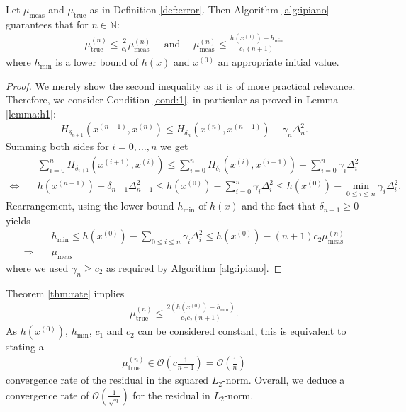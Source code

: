 \documentclass[onecolumn,final,a4paper,13pt,reqno]{siamart}
\begin{document}
\begin{theoremmd}
	Let $\mu_\text{meas}$ and $\mu_\text{true}$ as in Definition \ref{def:error}. Then Algorithm \ref{alg:ipiano} guarantees that for $n \in \mathbb{N}$:
	\begin{align}
		\mu_\text{true}^{(n)} \leq \frac{2}{c_1} \mu_\text{meas}^{(n)}\quad\text{ and }\quad \mu_\text{meas}^{(n)} \leq \frac{h(x^{(0)}) - h_{\min}}{c_1(n + 1)}
	\end{align}
	where $h_{\min}$ is a lower bound of $h(x)$ and $x^{(0)}$ an appropriate initial value.\label{thm:rate}
\end{theoremmd}

\begin{proof}
	We merely show the second inequality as it is of more practical relevance. Therefore, we consider Condition \ref{cond:1}, in particular as proved in Lemma \ref{lemma:h1}:
	\begin{align}
		H_{\delta_{n + 1}}(x^{(n + 1)}, x^{(n)}) \leq H_{\delta_n}(x^{(n)}, x^{(n -1)}) - \gamma_n \Delta_n^2.
	\end{align}
	Summing both sides for $i = 0, \ldots, n$ we get
	\begin{align}
		&\sum_{i = 0}^n H_{\delta_{i + 1}}(x^{(i + 1)}, x^{(i)}) \leq \sum_{i = 0}^n H_{\delta_i}(x^{(i)}, x^{(i - 1)}) - \sum_{i = 0}^n \gamma_i \Delta_i^2\\
		\Leftrightarrow\quad& h(x^{(n + 1)}) + \delta_{n + 1} \Delta_{n + 1}^2 \leq h(x^{(0)}) - \sum_{i = 0}^n \gamma_i \Delta_i^2 \leq h(x^{(0)}) - \min_{0 \leq i \leq n} \gamma_i \Delta_i^2.
	\end{align}
	Rearrangement, using the lower bound $h_{\min}$ of $h(x)$ and the fact that $\delta_{n + 1} \geq 0$ yields
	\begin{align}
		&h_{\min} \leq h(x^{(0)}) - \sum_{0 \leq i \leq n} \gamma_i \Delta_i^2 \leq h(x^{(0)}) - (n + 1) c_2 \mu_\text{meas}^{(n)}\\
		\Rightarrow\quad& \mu_\text{meas}
	\end{align}
	where we used $\gamma_n \geq c_2$ as required by Algorithm \ref{alg:ipiano}.
\end{proof}

Theorem \ref{thm:rate} implies
\begin{align}
	\mu_\text{true}^{(n)} \leq \frac{2(h(x^{(0)}) - h_{\min})}{c_1 c_2 (n + 1)}.
\end{align}
As $h(x^{(0)})$, $h_{\min}$, $c_1$ and $c_2$ can be considered constant, this is equivalent to stating a
\begin{align}
	\mu_\text{true}^{(n)} \in \mathcal{O}(c \frac{1}{n + 1}) = \mathcal{O}(\frac{1}{n})
\end{align}
convergence rate of the residual in the squared $L_2$-norm. Overall, we deduce a convergence rate of $\mathcal{O}(\frac{1}{\sqrt{n}})$ for the residual in $L_2$-norm.
\end{document}
